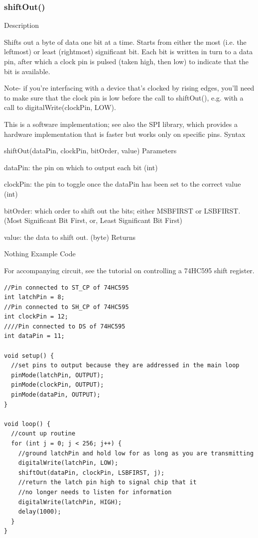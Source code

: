 \documentclass[12pt,a4paper]{report}  %
\begin{document}
\subsubsection{shiftOut()}\label{shiftOut}

Description

Shifts out a byte of data one bit at a time. Starts from either the most (i.e. the leftmost) or least (rightmost) significant bit. Each bit is written in turn to a data pin, after which a clock pin is pulsed (taken high, then low) to indicate that the bit is available.

Note- if you’re interfacing with a device that’s clocked by rising edges, you’ll need to make sure that the clock pin is low before the call to shiftOut(), e.g. with a call to digitalWrite(clockPin, LOW).

This is a software implementation; see also the SPI library, which provides a hardware implementation that is faster but works only on specific pins.
Syntax

shiftOut(dataPin, clockPin, bitOrder, value)
Parameters

dataPin: the pin on which to output each bit (int)

clockPin: the pin to toggle once the dataPin has been set to the correct value (int)

bitOrder: which order to shift out the bits; either MSBFIRST or LSBFIRST. (Most Significant Bit First, or, Least Significant Bit First)

value: the data to shift out. (byte)
Returns

Nothing
Example Code

For accompanying circuit, see the tutorial on controlling a 74HC595 shift register.

\begin{lstlisting}[label=digitalwrite,caption=shiftOut]
//Pin connected to ST_CP of 74HC595
int latchPin = 8;
//Pin connected to SH_CP of 74HC595
int clockPin = 12;
////Pin connected to DS of 74HC595
int dataPin = 11;

void setup() {
  //set pins to output because they are addressed in the main loop
  pinMode(latchPin, OUTPUT);
  pinMode(clockPin, OUTPUT);
  pinMode(dataPin, OUTPUT);
}

void loop() {
  //count up routine
  for (int j = 0; j < 256; j++) {
    //ground latchPin and hold low for as long as you are transmitting
    digitalWrite(latchPin, LOW);
    shiftOut(dataPin, clockPin, LSBFIRST, j);
    //return the latch pin high to signal chip that it
    //no longer needs to listen for information
    digitalWrite(latchPin, HIGH);
    delay(1000);
  }
}
\end{lstlisting}
\end{document}
